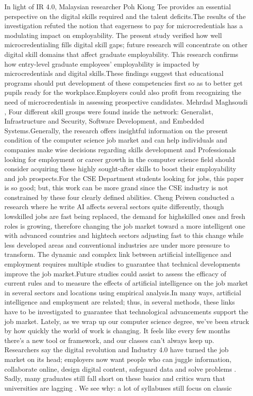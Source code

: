 \documentclass[final,5p,times,twocolumn]{elsarticle}
\begin{document}
In light of IR 4.0, Malaysian researcher Poh Kiong Tee \cite{M1_tee2024bridging} provides an essential perspective on the digital skills required and the talent deficits.The results of the investigation refuted the notion that eagerness to pay for microcredentials has a modulating impact on employability. The present study verified how well microcredentialing fills digital skill gaps; future research will concentrate on other digital skill domains that affect graduate employability. This research confirms how entry-level graduate employees' employability is impacted by microcredentials and digital skills.These findings suggest that educational programs should put development of these competencies first so as to better get pupils ready for the workplace.Employers could also profit from recognizing the need of microcredentials in assessing prospective candidates. Mehrdad Maghsoudi \cite{M2_maghsoudi2024uncovering}, Four different skill groups were found inside the network: Generalist, Infrastructure and Security, Software Development, and Embedded Systems.Generally, the research offers insightful information on the present condition of the computer science job market and can help individuals and companies make wise decisions regarding skills development and Professionals looking for employment or career growth in the computer science field should consider acquiring these highly sought-after skills to boost their employability and job prospects.For the CSE Department students looking for jobs, this paper is so good; but, this work can be more grand since the CSE industry is not constrained by these four clearly defined abilities. Cheng Peiwen \cite{M3_peiwen2025impact} conducted a research where he write AI affects several sectors quite differently, though lowskilled jobs are fast being replaced, the demand for highskilled ones and fresh roles is growing, therefore changing the job market toward a more intelligent one with advanced countries and hightech sectors adjusting fast to this change while less developed areas and conventional industries are under more pressure to transform. The dynamic and complex link between artificial intelligence and employment requires multiple studies to guarantee that technical developments improve the job market.Future studies could assist to assess the efficacy of current rules and to measure the effects of artificial intelligence on the job market in several sectors and locations using empirical analysis.In many ways, artificial intelligence and employment are related; thus, in several methods, these links have to be investigated to guarantee that technological advancements support the job market. Lately, as we wrap up our computer science degree, we've been struck by how quickly the world of work is changing. It feels like every few months there's a new tool or framework, and our classes can't always keep up. Researchers say the digital revolution and Industry 4.0 have turned the job market on its head; employers now want people who can juggle information, collaborate online, design digital content, safeguard data and solve problems \cite{M4_1_tee2024demand}. Sadly, many graduates still fall short on these basics and critics warn that universities are lagging \cite{M4_1_tee2024demand}. We see why: a lot of syllabuses still focus on classic 
\end{document}
